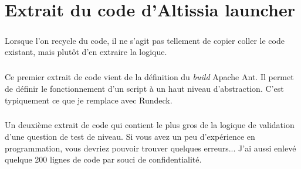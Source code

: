 \chapter{Extrait du code d'Altissia launcher}
\label{ch:altissia-launcher-code}

\paragraph{}
Lorsque l'on recycle du code, il ne s'agit pas tellement de copier coller le code existant, mais plutôt d'en extraire la logique.

\paragraph{}
Ce premier extrait de code vient de la définition du \textit{build}\fnmark{} Apache Ant.
Il permet de définir le fonctionnement d'un script à un haut niveau d'abstraction.
C'est typiquement ce que je remplace avec Rundeck.




\paragraph{}
Un deuxième extrait de code qui contient le plus gros de la logique de validation d'une question de test de niveau.
Si vous avez un peu d'expérience en programmation, vous devriez pouvoir trouver quelques erreurs...
J'ai aussi enlevé quelque 200 lignes de code par souci de confidentialité.


